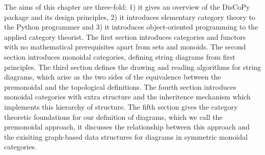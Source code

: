 The aims of this chapter are three-fold: 1) it gives an overview of the DisCoPy package and its design principles, 2) it introduces elementary category theory to the Python programmer and 3) it introduces object-oriented programming to the applied category theorist.
The first section introduces categories and functors with no mathematical prerequisites apart from sets and monoids.
The second section introduces monoidal categories, defining string diagrams from first principles.
The third section defines the drawing and reading algorithms for string diagrams, which arise as the two sides of the equivalence between the premonoidal and the topological definitions.
The fourth section introduces monoidal categories with extra structure and the inheritence mechanism which implements this hierarchy of structure.
The fifth section gives the category theoretic foundations for our definition of diagrams, which we call the premonoidal approach, it discusses the relationship between this approach and the exisiting graph-based data structures for diagrams in symmetric monoidal categories.

